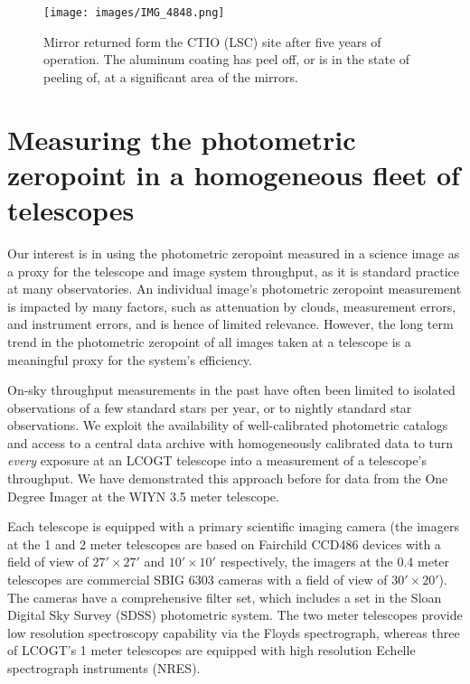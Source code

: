 \documentclass[]{spieman}
\begin{document}
\begin{figure}
\texttt{[image: images/IMG\_4848.png]}
\caption{\label{fig_mirrorpeel} Mirror returned form the CTIO (LSC) site after five years of
operation. The aluminum coating has peel off, or is in the state of peeling of, at a significant
area of the mirrors. }
\end{figure}


\section{Measuring the photometric zeropoint in a homogeneous fleet of telescopes}


Our interest is in using the photometric zeropoint measured in a science image as a proxy for the
telescope and image system throughput, as it is standard practice at many observatories. An
individual image's photometric zeropoint measurement is impacted by many factors, such as
attenuation by clouds, measurement errors, and instrument errors, and is hence of limited relevance.
However, the long term trend in the photometric zeropoint of all images taken at a telescope is a
meaningful proxy for the system's efficiency.

On-sky throughput measurements in the past have often been limited to isolated observations of a few
standard stars per year\cite{benn2000}, or to nightly standard star observations\cite{hopp2008}. We
exploit the availability of well-calibrated photometric catalogs and access to a central
data archive with homogeneously calibrated data to turn {\em every} exposure at an LCOGT telescope
into a measurement of a telescope's throughput. We have demonstrated this approach before for data
from the One Degree Imager at the WIYN 3.5 meter telescope\cite{harbeck2014}.

Each telescope is equipped with a primary scientific imaging camera (the imagers at the 1 and 2
meter telescopes are based on Fairchild CCD486 devices with a field of view of $27' \times 27'$ and
$10' \times 10'$ respectively, the imagers at the 0.4 meter telescopes are commercial SBIG 6303
cameras with a field of view of $30' \times 20'$). The cameras have a comprehensive filter set,
which includes a set in the Sloan Digital Sky Survey (SDSS) photometric system\cite{fukugita1996}.
The two meter telescopes provide low resolution spectroscopy capability via the
Floyds\cite{brown2013} spectrograph, whereas three of LCOGT's 1 meter telescopes are equipped with
high resolution Echelle spectrograph instruments (NRES)\cite{eastman2014,siverd2016}.
\end{document}
